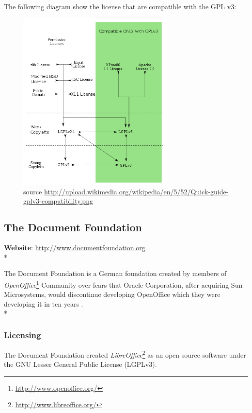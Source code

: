 \documentclass[11pt]{article} %
\begin{document}
The  following diagram show the license that are compatible with the GPL v3:

\begin{figure}[H]
    \centering
    \includegraphics[width=0.7\textwidth]{gplv3-compatibility}
    \caption{source \url {http://upload.wikimedia.org/wikipedia/en/5/52/Quick-guide-gplv3-compatibility.png}}
    \label{}
\end{figure}

\subsection{The Document Foundation} %

\textbf{Website}: \url {http://www.documentfoundation.org}\\*

The Document Foundation is a German foundation created by members of \emph{OpenOffice}\footnote{\url{http://www.openoffice.org/}} Community over fears that Oracle Corporation, after acquiring Sun Microsystems, would discontinue developing OpenOffice  which they were developing it in ten years .\\*

\subsubsection{Licensing}

The Document Foundation created \emph{LibreOffice}\footnote{\url{http://www.libreoffice.org/}} as an open source software under the GNU Lesser General Public License (LGPLv3).
\end{document}

